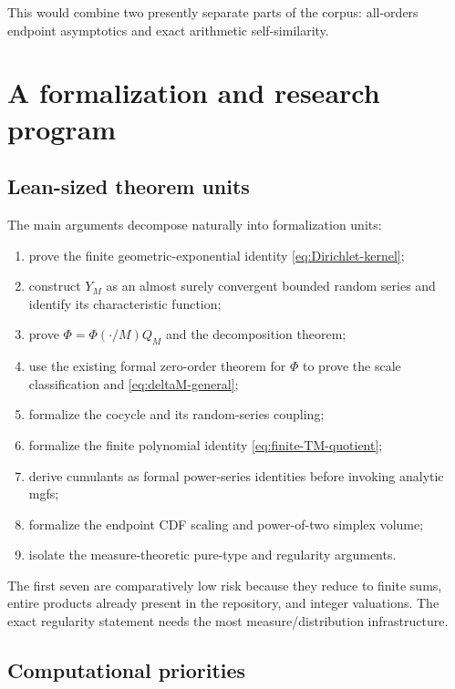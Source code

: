 \documentclass[11pt,oneside]{article}
\theoremstyle{definition}
\theoremstyle{remark}
\numberwithin{equation}{section}
\newcommand{\1}{\mathbf 1}
\begin{document}
This would combine two presently separate parts of the corpus: all-orders endpoint
asymptotics and exact arithmetic self-similarity.

\section{A formalization and research program}
\label{sec:program}

\subsection{Lean-sized theorem units}

The main arguments decompose naturally into formalization units:
\begin{enumerate}
\item prove the finite geometric-exponential identity \eqref{eq:Dirichlet-kernel};
\item construct $Y_M$ as an almost surely convergent bounded random series and identify its
characteristic function;
\item prove $\Phi=\Phi(\cdot/M)Q_M$ and the decomposition theorem;
\item use the existing formal zero-order theorem for $\Phi$ to prove the scale
classification and \eqref{eq:deltaM-general};
\item formalize the cocycle and its random-series coupling;
\item formalize the finite polynomial identity \eqref{eq:finite-TM-quotient};
\item derive cumulants as formal power-series identities before invoking analytic mgfs;
\item formalize the endpoint CDF scaling and power-of-two simplex volume;
\item isolate the measure-theoretic pure-type and regularity arguments.
\end{enumerate}
The first seven are comparatively low risk because they reduce to finite sums, entire
products already present in the repository, and integer valuations.  The exact regularity
statement needs the most measure/distribution infrastructure.

\subsection{Computational priorities}
\end{document}

